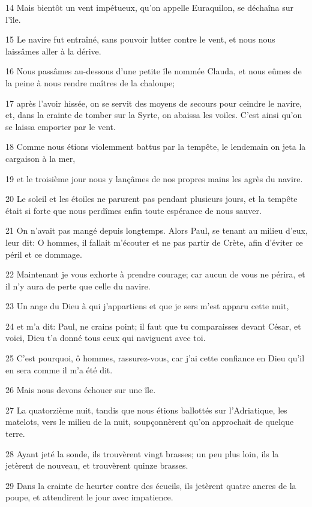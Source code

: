 \par 14 Mais bientôt un vent impétueux, qu'on appelle Euraquilon, se déchaîna sur l'île.
\par 15 Le navire fut entraîné, sans pouvoir lutter contre le vent, et nous nous laissâmes aller à la dérive.
\par 16 Nous passâmes au-dessous d'une petite île nommée Clauda, et nous eûmes de la peine à nous rendre maîtres de la chaloupe;
\par 17 après l'avoir hissée, on se servit des moyens de secours pour ceindre le navire, et, dans la crainte de tomber sur la Syrte, on abaissa les voiles. C'est ainsi qu'on se laissa emporter par le vent.
\par 18 Comme nous étions violemment battus par la tempête, le lendemain on jeta la cargaison à la mer,
\par 19 et le troisième jour nous y lançâmes de nos propres mains les agrès du navire.
\par 20 Le soleil et les étoiles ne parurent pas pendant plusieurs jours, et la tempête était si forte que nous perdîmes enfin toute espérance de nous sauver.
\par 21 On n'avait pas mangé depuis longtemps. Alors Paul, se tenant au milieu d'eux, leur dit: O hommes, il fallait m'écouter et ne pas partir de Crète, afin d'éviter ce péril et ce dommage.
\par 22 Maintenant je vous exhorte à prendre courage; car aucun de vous ne périra, et il n'y aura de perte que celle du navire.
\par 23 Un ange du Dieu à qui j'appartiens et que je sers m'est apparu cette nuit,
\par 24 et m'a dit: Paul, ne crains point; il faut que tu comparaisses devant César, et voici, Dieu t'a donné tous ceux qui naviguent avec toi.
\par 25 C'est pourquoi, ô hommes, rassurez-vous, car j'ai cette confiance en Dieu qu'il en sera comme il m'a été dit.
\par 26 Mais nous devons échouer sur une île.
\par 27 La quatorzième nuit, tandis que nous étions ballottés sur l'Adriatique, les matelots, vers le milieu de la nuit, soupçonnèrent qu'on approchait de quelque terre.
\par 28 Ayant jeté la sonde, ils trouvèrent vingt brasses; un peu plus loin, ils la jetèrent de nouveau, et trouvèrent quinze brasses.
\par 29 Dans la crainte de heurter contre des écueils, ils jetèrent quatre ancres de la poupe, et attendirent le jour avec impatience.
